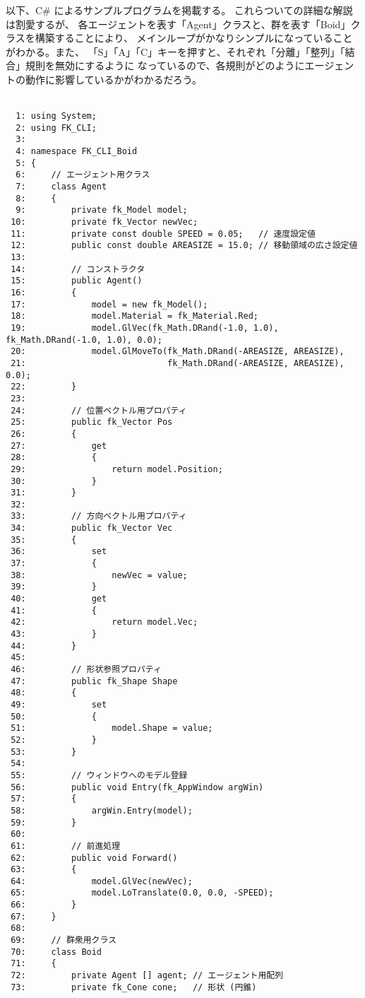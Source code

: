 以下、C\# によるサンプルプログラムを掲載する。
これらついての詳細な解説は割愛するが、
各エージェントを表す「Agent」クラスと、群を表す「Boid」クラスを構築することにより、
メインループがかなりシンプルになっていることがわかる。また、
「S」「A」「C」キーを押すと、それぞれ「分離」「整列」「結合」規則を無効にするように
なっているので、各規則がどのようにエージェントの動作に影響しているかがわかるだろう。\\ ~
\begin{breakbox}
\begin{small}
\begin{verbatim}
  1: using System;
  2: using FK_CLI;
  3: 
  4: namespace FK_CLI_Boid
  5: {
  6:     // エージェント用クラス
  7:     class Agent
  8:     {
  9:         private fk_Model model;
 10:         private fk_Vector newVec;
 11:         private const double SPEED = 0.05;   // 速度設定値
 12:         public const double AREASIZE = 15.0; // 移動領域の広さ設定値
 13: 
 14:         // コンストラクタ
 15:         public Agent()
 16:         {
 17:             model = new fk_Model();
 18:             model.Material = fk_Material.Red;
 19:             model.GlVec(fk_Math.DRand(-1.0, 1.0), fk_Math.DRand(-1.0, 1.0), 0.0);
 20:             model.GlMoveTo(fk_Math.DRand(-AREASIZE, AREASIZE),
 21:                            fk_Math.DRand(-AREASIZE, AREASIZE), 0.0);
 22:         }
 23: 
 24:         // 位置ベクトル用プロパティ
 25:         public fk_Vector Pos
 26:         {
 27:             get
 28:             {
 29:                 return model.Position;
 30:             }
 31:         }
 32: 
 33:         // 方向ベクトル用プロパティ
 34:         public fk_Vector Vec
 35:         {
 36:             set
 37:             {
 38:                 newVec = value;
 39:             }
 40:             get
 41:             {
 42:                 return model.Vec;
 43:             }
 44:         }
 45: 
 46:         // 形状参照プロパティ
 47:         public fk_Shape Shape
 48:         {
 49:             set
 50:             {
 51:                 model.Shape = value;
 52:             }
 53:         }
 54: 
 55:         // ウィンドウへのモデル登録
 56:         public void Entry(fk_AppWindow argWin)
 57:         {
 58:             argWin.Entry(model);
 59:         }
 60: 
 61:         // 前進処理
 62:         public void Forward()
 63:         {
 64:             model.GlVec(newVec);
 65:             model.LoTranslate(0.0, 0.0, -SPEED);
 66:         }
 67:     }
 68: 
 69:     // 群衆用クラス
 70:     class Boid
 71:     {
 72:         private Agent [] agent; // エージェント用配列
 73:         private fk_Cone cone;   // 形状 (円錐)

\end{verbatim}
\end{small}
\end{breakbox}
